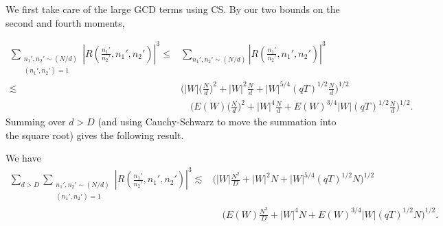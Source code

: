 We first take care of the large GCD terms using CS. By our two bounds on the second and fourth moments,

\begin{align*}
    \sum_{\substack{n_1',n_2'\sim (N/d)\\(n_1',n_2')=1}}  \left|R\left(\frac{n_1'}{n_2'} ,n_1',n_2'\right) \right|^3\leq& 
    \sum_{n_1',n_2' \sim (N/d)}  \left|R\left(\frac{n_1'}{n_2'} ,n_1',n_2' \right)\right|^3 \\
    \lesssim&
    \Bigg(|W|\Bigg(\frac{N}{d}\Bigg)^2+ |W|^2\frac{N}{d} + |W|^{5/4}(qT)^{1/2}\frac{N}{d}\Bigg)^{1/2}\\ &\quad
    \Bigg(E(W)\Bigg(\frac{N}{d}\Bigg)^2+ |W|^4\frac{N}{d} +  E(W)^{3/4}|W|(qT)^{1/2}\frac{N}{d}\Bigg)^{1/2}.
\end{align*}
Summing over $d>D$ (and using Cauchy-Schwarz to move the summation into the square root) gives the following result.
\begin{proposition}
    We have \begin{align*}
        \sum_{d> D}\sum_{\substack{n_1',n_2'\sim (N/d)\\(n_1',n_2')=1}}  \left|R\left(\frac{n_1'}{n_2'} ,n_1',n_2'\right) \right|^3 \lesssim & \Bigg(|W|\frac{N^2}{D}+ |W|^2N + |W|^{5/4}(qT)^{1/2}N\Bigg)^{1/2}\\ &\quad
        \Bigg(E(W)\frac{N^2}{D}+ |W|^4N+  E(W)^{3/4}|W|(qT)^{1/2}N\Bigg)^{1/2}.
    \end{align*}
\end{proposition}

